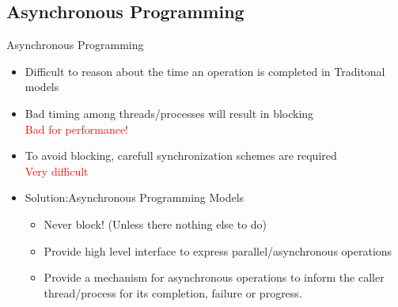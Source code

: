 \documentclass[svgnames]{beamer}
\begin{document}
\subsection{Asynchronous Programming}
\begin{frame}{Asynchronous Programming}
\begin{itemize}
	\item Difficult to reason about the time an operation is completed in Traditonal models
	\item Bad timing among threads/processes will result in blocking\\
				\textcolor{red}{Bad for performance!}
	\item To avoid blocking, carefull synchronization schemes are required \\
				\textcolor{red}{Very difficult} 
	\item Solution:Asynchronous Programming Models
	\begin{itemize}
		\item Never block! (Unless there nothing else to do)
		\item Provide high level interface to express parallel/asynchronous operations
		\item Provide a mechanism for asynchronous operations to inform the caller thread/process 
					for its completion, failure or progress.
	\end{itemize}
\end{itemize}
\end{frame}
\end{document}
